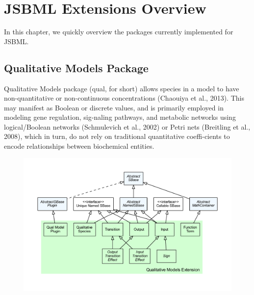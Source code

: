 
\chapter{JSBML Extensions Overview}
\label{sec:extensionsOverview}

In this chapter, we quickly overview the \SBMLthree packages currently
implemented for JSBML.

\section{Qualitative Models Package}
\label{sec:qual-overview}

Qualitative Models package (qual, for short) allows species in a model to 
have non-quantitative or non-continuous concentrations (Chaouiya et al., 2013). 
This may manifest as Boolean or discrete values, and is primarily employed in 
modeling gene regulation, sig-naling pathways, and metabolic networks using 
logical/Boolean networks (Schmulevich et al., 2002) or Petri nets 
(Breitling et al., 2008), which in turn, do not rely on traditional quantitative
coeffi-cients to encode relationships between biochemical entities.

\begin{figure}[hb]
 \centering
 \vspace*{2ex}
 \includegraphics[width=\textwidth]{../../../extensions/qual/doc/img/type_hierarchy.pdf}
 \caption[The qualitative models extension]{}
 \label{fig:qual}
\end{figure}

